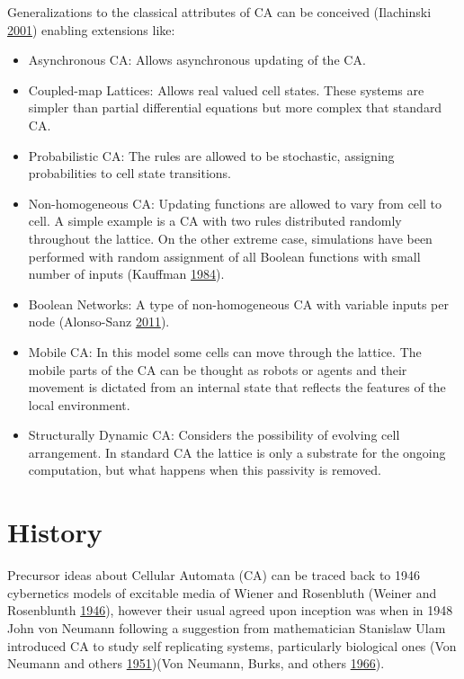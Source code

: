 \documentclass[
]{book}
\begin{document}
Generalizations to the classical attributes of CA can be conceived (Ilachinski \protect\hyperlink{ref-ilachinski2001cellular}{2001}) enabling extensions like:

\begin{itemize}
\item
  Asynchronous CA:
  Allows asynchronous updating of the CA.
\item
  Coupled-map Lattices:
  Allows real valued cell states. These systems are simpler than partial differential equations but more complex that standard CA.
\item
  Probabilistic CA:
  The rules are allowed to be stochastic, assigning probabilities to cell state transitions.
\item
  Non-homogeneous CA:
  Updating functions are allowed to vary from cell to cell. A simple example is a CA with two rules distributed randomly throughout the lattice. On the other extreme case, simulations have been performed with random assignment of all Boolean functions with small number of inputs (Kauffman \protect\hyperlink{ref-kauffman1984emergent}{1984}).
\item
  Boolean Networks:
  A type of non-homogeneous CA with variable inputs per node (Alonso-Sanz \protect\hyperlink{ref-alonso2011discrete}{2011}).
\item
  Mobile CA:
  In this model some cells can move through the lattice. The mobile parts of the CA can be thought as robots or agents and their movement is dictated from an internal state that reflects the features of the local environment.
\item
  Structurally Dynamic CA:
  Considers the possibility of evolving cell arrangement. In standard CA the lattice is only a substrate for the ongoing computation, but what happens when this passivity is removed.
\end{itemize}

\hypertarget{history}{%
\section{History}\label{history}}

Precursor ideas about Cellular Automata (CA) can be traced back to 1946 cybernetics models of excitable media of Wiener and Rosenbluth (Weiner and Rosenblunth \protect\hyperlink{ref-weiner1946mathematical}{1946}), however their usual agreed upon inception was when in 1948 John von Neumann following a suggestion from mathematician Stanislaw Ulam introduced CA to study self replicating systems, particularly biological ones (Von Neumann and others \protect\hyperlink{ref-von1951general}{1951})(Von Neumann, Burks, and others \protect\hyperlink{ref-von1966theory}{1966}).
\end{document}
